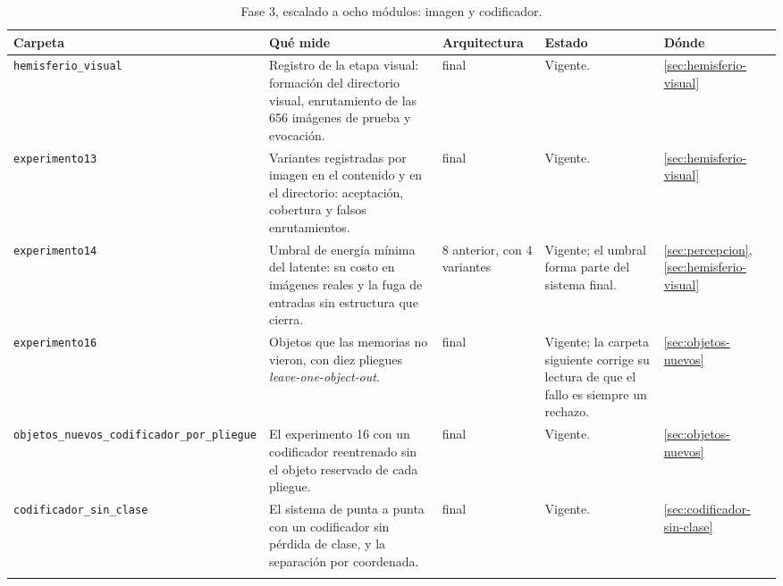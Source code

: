\begin{table}[H]
\centering
\caption[Fase 3, escalado a ocho módulos: imagen y codificador]{Fase 3, escalado a ocho módulos: imagen y codificador.}
\label{tab:fase3-visual}
\label{tab:exp-visual}
\footnotesize
\setlength{\tabcolsep}{3pt}
\begin{tabular}{p{3.1cm}p{4.7cm}p{2.0cm}p{3.1cm}p{1.6cm}}
\toprule
Carpeta & Qué mide & Arquitectura & Estado & Dónde \tabularnewline
\midrule
\raggedright \texttt{hemisferio\_\allowbreak visual} &
\raggedright Registro de la etapa visual: formación del directorio visual, enrutamiento de las 656 imágenes de prueba y evocación. &
\raggedright final &
\raggedright Vigente. &
\raggedright \ref{sec:hemisferio-visual} \tabularnewline\addlinespace[4pt]
\raggedright \texttt{experimento13} &
\raggedright Variantes registradas por imagen en el contenido y en el directorio: aceptación, cobertura y falsos enrutamientos. &
\raggedright final &
\raggedright Vigente. &
\raggedright \ref{sec:hemisferio-visual} \tabularnewline\addlinespace[4pt]
\raggedright \texttt{experimento14} &
\raggedright Umbral de energía mínima del latente: su costo en imágenes reales y la fuga de entradas sin estructura que cierra. &
\raggedright 8 anterior, con 4 variantes &
\raggedright Vigente; el umbral forma parte del sistema final. &
\raggedright \ref{sec:percepcion}, \ref{sec:hemisferio-visual} \tabularnewline\addlinespace[4pt]
\raggedright \texttt{experimento16} &
\raggedright Objetos que las memorias no vieron, con diez pliegues \textit{leave-one-object-out}. &
\raggedright final &
\raggedright Vigente; la carpeta siguiente corrige su lectura de que el fallo es siempre un rechazo. &
\raggedright \ref{sec:objetos-nuevos} \tabularnewline\addlinespace[4pt]
\raggedright \texttt{objetos\_\allowbreak nuevos\_\allowbreak codificador\_\allowbreak por\_\allowbreak pliegue} &
\raggedright El experimento 16 con un codificador reentrenado sin el objeto reservado de cada pliegue. &
\raggedright final &
\raggedright Vigente. &
\raggedright \ref{sec:objetos-nuevos} \tabularnewline\addlinespace[4pt]
\raggedright \texttt{codificador\_\allowbreak sin\_\allowbreak clase} &
\raggedright El sistema de punta a punta con un codificador sin pérdida de clase, y la separación por coordenada. &
\raggedright final &
\raggedright Vigente. &
\raggedright \ref{sec:codificador-sin-clase} \tabularnewline\addlinespace[4pt]
\bottomrule
\end{tabular}
\end{table}


